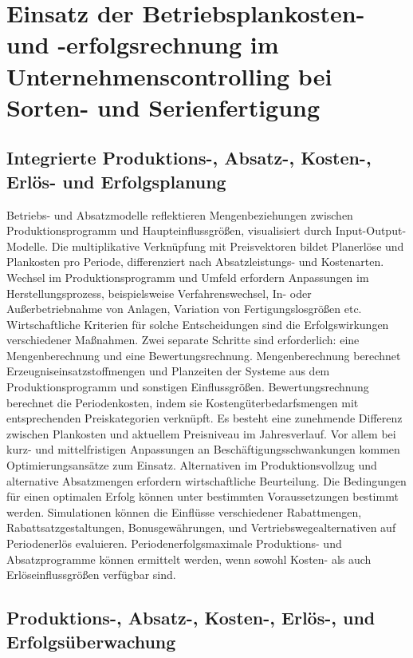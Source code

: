 \section{Einsatz der Betriebsplankosten- und -erfolgsrechnung im Unternehmenscontrolling bei Sorten- und Serienfertigung}

\subsection{Integrierte Produktions-, Absatz-, Kosten-, Erlös- und Erfolgsplanung}

Betriebs- und Absatzmodelle reflektieren Mengenbeziehungen zwischen Produktionsprogramm und Haupteinflussgrö{\ss}en, visualisiert durch Input-Output-Modelle. Die multiplikative Verknüpfung mit Preisvektoren bildet Planerlöse und Plankosten pro Periode, differenziert nach Absatzleistungs- und Kostenarten. Wechsel im Produktionsprogramm und Umfeld erfordern Anpassungen im Herstellungsprozess, beispielsweise Verfahrenswechsel, In- oder Au{\ss}erbetriebnahme von Anlagen, Variation von Fertigungslosgrö{\ss}en etc. Wirtschaftliche Kriterien für solche Entscheidungen sind die Erfolgswirkungen verschiedener Ma{\ss}nahmen. Zwei separate Schritte sind erforderlich: eine Mengenberechnung und eine Bewertungsrechnung. Mengenberechnung berechnet Erzeugniseinsatzstoffmengen und Planzeiten der Systeme aus dem Produktionsprogramm und sonstigen Einflussgrö{\ss}en. Bewertungsrechnung berechnet die Periodenkosten, indem sie Kostengüterbedarfsmengen mit entsprechenden Preiskategorien verknüpft. Es besteht eine zunehmende Differenz zwischen Plankosten und aktuellem Preisniveau im Jahresverlauf. Vor allem bei kurz- und mittelfristigen Anpassungen an Beschäftigungsschwankungen kommen Optimierungsansätze zum Einsatz. Alternativen im Produktionsvollzug und alternative Absatzmengen erfordern wirtschaftliche Beurteilung. Die Bedingungen für einen optimalen Erfolg können unter bestimmten Voraussetzungen bestimmt werden. Simulationen können die Einflüsse verschiedener Rabattmengen, Rabattsatzgestaltungen, Bonusgewährungen, und Vertriebswegealternativen auf Periodenerlös evaluieren. Periodenerfolgsmaximale Produktions- und Absatzprogramme können ermittelt werden, wenn sowohl Kosten- als auch Erlöseinflussgrö{\ss}en verfügbar sind.

\subsection{Produktions-, Absatz-, Kosten-, Erlös-, und Erfolgsüberwachung}

